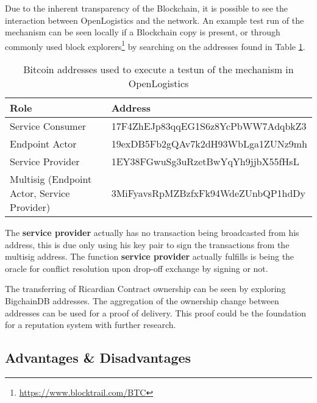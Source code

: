 Due to the inherent transparency of the Blockchain, it is possible to see the interaction between OpenLogistics and the network. An example test run of the mechanism can be seen locally if a Blockchain copy is present, or through commonly used block explorers\footnote{\url{https://www.blocktrail.com/BTC}}
 by searching on the addresses found in Table \ref{tab:addresses}.

\begin{table}[h]
  \begin{tabular}{ll}
    \hline
    \multicolumn{1}{|l|}{Role}                  & \multicolumn{1}{l|}{Address}                            \\ \hline
    \multicolumn{1}{|l|}{Service Consumer}      & \multicolumn{1}{l|}{17F4ZhEJp83qqEG1S6z8YcPbWW7AdqbkZ3} \\ \hline
    \multicolumn{1}{|l|}{Endpoint Actor}        & \multicolumn{1}{l|}{19exDB5Fb2gQAv7k2dH93WbLga1ZUNz9mh} \\ \hline
    \multicolumn{1}{|l|}{Service Provider}      & \multicolumn{1}{l|}{1EY38FGwuSg3uRzetBwYqYh9jjbX55fHsL} \\ \hline
    \multicolumn{1}{|l|}{Multisig (Endpoint Actor, Service Provider)}      & \multicolumn{1}{l|}{3MiFyavsRpMZBzfxFk94WdeZUnbQP1hdDy } \\ \hline
  \end{tabular}
  \caption{Bitcoin addresses used to execute a testun of the mechanism in OpenLogistics}
  \label{tab:addresses}
\end{table}

The \textbf{service provider} actually has no transaction being broadcasted from his address, this is due only using his key pair to sign the transactions from the multisig address. The function \textbf{service provider} actually fulfills is being the oracle for conflict resolution upon drop-off exchange by signing or not.\par
The transferring of Ricardian Contract ownership can be seen by exploring BigchainDB addresses. The aggregation of the ownership change between addresses can be used for a proof of delivery. This proof could be the foundation for a reputation system with further research.

\subsection{Advantages \& Disadvantages}

